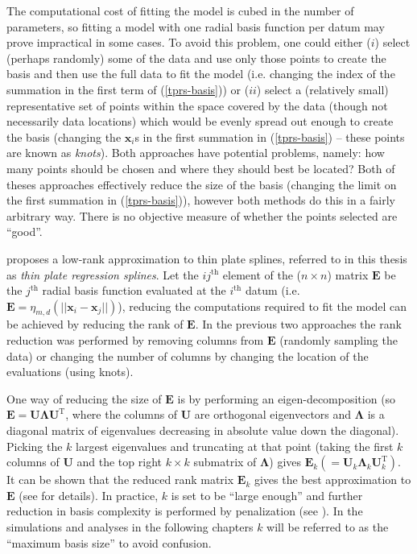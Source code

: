 The computational cost of fitting the model is cubed in the number of parameters, so fitting a model with one radial basis function per datum may prove impractical in some cases. To avoid this problem, one could either ($i$) select (perhaps randomly) some of the data and use only those points to create the basis and then use the full data to fit the model (i.e. changing the index of the summation in the first term of (\ref{tprs-basis})) or ($ii$) select a (relatively small) representative set of points within the space covered by the data (though not necessarily data locations) which would be evenly spread out enough to create the basis (changing the $\mathbf{x}_i$s in the first summation in (\ref{tprs-basis}) -- these points are known as \textit{knots}). Both approaches have potential problems, namely: how many points should be chosen and where they should best be located? Both of theses approaches effectively reduce the size of the basis (changing the limit on the first summation in (\ref{tprs-basis})), however both methods do this in a fairly arbitrary way. There is no objective measure of whether the points selected are ``good''. 

 proposes a low-rank approximation to thin plate splines, referred to in this thesis as \textit{thin plate regression splines}. Let the $ij^\text{th}$ element of the ($n \times n$) matrix $\mathbf{E}$ be the $j^\text{th}$ radial basis function evaluated at the $i^\text{th}$ datum (i.e. $\mathbf{E} = \eta_{m,d}\left (\vert\vert\mathbf{x}_i - \mathbf{x}_j \vert\vert \right )$), reducing the computations required to fit the model can be achieved by reducing the rank of $\mathbf{E}$. In the previous two approaches the rank reduction was performed by removing columns from $\mathbf{E}$ (randomly sampling the data) or changing the number of columns by changing the location of the evaluations (using knots). 

One way of reducing the size of $\mathbf{E}$ is by performing an eigen-decomposition (so $\mathbf{E}=\mathbf{U}\mathbf{\Lambda}\mathbf{U}^\text{T}$, where the columns of $\mathbf{U}$ are orthogonal eigenvectors and $\mathbf{\Lambda}$ is a diagonal matrix of eigenvalues decreasing in absolute value down the diagonal). Picking the $k$ largest eigenvalues and truncating at that point (taking the first $k$ columns of $\mathbf{U}$ and the top right $k\times k$ submatrix of $\mathbf{\Lambda}$) gives $\mathbf{E}_k(=\mathbf{U}_k\mathbf{\Lambda}_k\mathbf{U}_k^\text{T})$. It can be shown that the reduced rank matrix $\mathbf{E}_k$ gives the best approximation to $\mathbf{E}$ (see \cite{wood2003} for details). In practice, $k$ is set to be ``large enough'' and further reduction in basis complexity is performed by penalization (see ). In the simulations and analyses in the following chapters $k$ will be referred to as the ``maximum basis size'' to avoid confusion.

